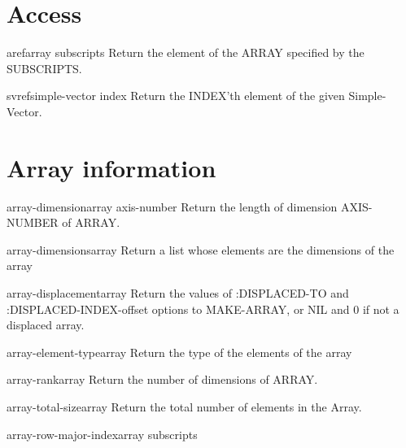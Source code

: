 \documentclass[10pt,english]{book}
\begin{document}
\section{Access}
\label{sec:array-access}

\begin{accessor}{aref}{array \rest subscripts}
  Return the element of the ARRAY specified by the SUBSCRIPTS.
\end{accessor}

\begin{accessor}{svref}{simple-vector index}
  Return the INDEX'th element of the given Simple-Vector.
\end{accessor}

\section{Array information}
\label{sec:array-information}

\begin{function}{array-dimension}{array axis-number}
  Return the length of dimension AXIS-NUMBER of ARRAY.
\end{function}

\begin{function}{array-dimensions}{array}
  Return a list whose elements are the dimensions of the array
\end{function}

\begin{function}{array-displacement}{array}
  Return the values of :DISPLACED-TO and :DISPLACED-INDEX-offset
   options to MAKE-ARRAY, or NIL and 0 if not a displaced array.
\end{function}

\begin{function}{array-element-type}{array}
  Return the type of the elements of the array
\end{function}

\begin{function}{array-rank}{array}
  Return the number of dimensions of ARRAY.
\end{function}

\begin{function}{array-total-size}{array}
  Return the total number of elements in the Array.
\end{function}

\begin{function}{array-row-major-index}{array \rest subscripts}
  
\end{function}
\end{document}
